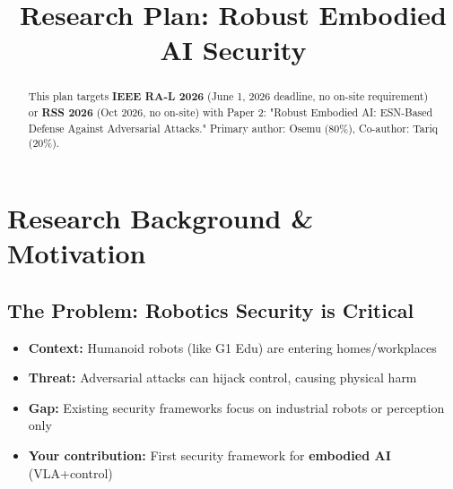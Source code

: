 \documentclass[conference]{IEEEtran}
\begin{document}
\title{Research Plan: Robust Embodied AI Security}

\author{
\and
{}
}

\maketitle

\begin{abstract}
This plan targets \textbf{IEEE RA-L 2026} (June 1, 2026 deadline, no on-site requirement) or \textbf{RSS 2026} (Oct 2026, no on-site) with Paper 2: "Robust Embodied AI: ESN-Based Defense Against Adversarial Attacks." Primary author: Osemu (80\%), Co-author: Tariq (20\%).
\end{abstract}

\section{Research Background \& Motivation}

\subsection{The Problem: Robotics Security is Critical}
\begin{itemize}
    \item \textbf{Context:} Humanoid robots (like G1 Edu) are entering homes/workplaces
    \item \textbf{Threat:} Adversarial attacks can hijack control, causing physical harm
    \item \textbf{Gap:} Existing security frameworks focus on industrial robots or perception only
    \item \textbf{Your contribution:} First security framework for \textbf{embodied AI} (VLA+control)
\end{itemize}
\end{document}
